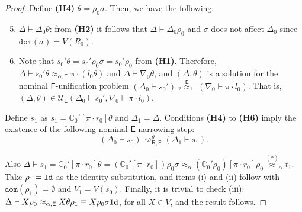 \documentclass[11pt,a4paper]{amsart}
\newcommand{\aleq}{\approx_{\alpha}}
\newcommand{\ealeq}{\approx_{\alpha,\theory{E}}}
\newcommand{\dom}[1]{\mathtt{dom}(#1)}
\newcommand{\theory}[1]{\ensuremath{\mathsf{#1}}}
\newcommand{\context}[1]{\mathbb{C}}
\theoremstyle{plain}
\theoremstyle{definition}
\theoremstyle{remark}
\begin{document}
\begin{proof}
Define {\bf (H4)} $\theta=\rho_0\sigma$. 
Then, we have the following:
\begin{enumerate}[{\bf (H1)}]
\setcounter{enumi}{4}
    \item $\Delta \vdash \Delta_0\theta$: from {\bf (H2)} it follows that $\Delta \vdash \Delta_0\rho_0$ and $\sigma$ does not affect $\Delta_0$ since $\texttt{dom}(\sigma) = V(R_0)$.
    \item Note that $s_0'\theta=s_0'\rho_0\sigma=s_0'\rho_0$ from {\bf (H1)}. Therefore, $\Delta \vdash s_0'\theta \ealeq \pi\cdot (l_0\theta)$ and $\Delta \vdash\nabla_0\theta$,
    and  $(\Delta,\theta)$
    is a solution for the nominal \theory{E}-unification problem $(\Delta_0 \vdash s_0') \; _?\overset{\theory{E}}{{\approx}}_? \; (\nabla_0 \vdash \pi\cdot l_0)$. That is, $(\Delta, \theta)\in \mathcal{U}_\theory{E}(\Delta_0 \vdash s_0', \nabla_0 \vdash \pi\cdot l_0)$.
\end{enumerate}

Define $s_1$ as $s_1=\context{C}_0'[\pi\cdot r_0]\theta$ and $\Delta_1=\Delta$. Conditions {\bf (H4)} to {\bf (H6)} imply the existence of the  following nominal  \theory{E}-narrowing step:
 $$(\Delta_0 \vdash s_0) \rightsquigarrow^\theta_{\theory{R,E}} (\Delta_1 \vdash s_1).$$

Also $\Delta\vdash s_1=\context{C}_0'[\pi\cdot r_0]\theta=(\context{C}_0'[\pi\cdot r_0])\rho_0\sigma \aleq (\context{C}_0'\rho_0)[\pi\cdot r_0]\rho_0 \overset{(*)}{\approx}_{\alpha}  t_1$. Take $\rho_1={\tt Id}$ as the identity substitution, and items (i) and (ii) follow with $\dom{\rho_1}=\emptyset$ and $V_1=V(s_0)$.
Finally, it is trivial to check (iii):   $\Delta\vdash X\rho_0\ealeq  X\theta\rho_1\equiv X\rho_0\sigma{\tt Id}$, for all $X\in V$, and the result follows.





\end{proof}
\end{document}

